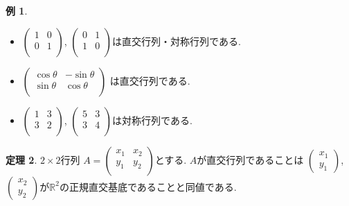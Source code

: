 \documentclass[dvipdfmx,a4paper,11pt]{article}
\newcommand{\R}{\mathbb{R}}
\theoremstyle{definition}
\newtheorem{thm}{定理}
\newtheorem{exa}[thm]{例}
\begin{document}
 \begin{exa}
 \begin{itemize}
\setlength{\parskip}{0cm}
 \setlength{\itemsep}{0pt} 
\item  $\begin{pmatrix}
1& 0 \\
0& 1 \\
\end{pmatrix}
$, 
 $\begin{pmatrix}
0& 1\\
1& 0 \\
\end{pmatrix}
$は直交行列・対称行列である.

\item $
\begin{pmatrix}
\cos \theta & -\sin \theta\\
\sin \theta& \cos \theta  \\
\end{pmatrix}
$
は直交行列である.

\item  $\begin{pmatrix}
1& 3 \\
3& 2 \\
\end{pmatrix}
$, 
 $\begin{pmatrix}
5& 3\\
3& 4 \\
\end{pmatrix}
$は対称行列である.
\end{itemize}
 \end{exa}



 \begin{tcolorbox}[
    colback = white,
    colframe = green!35!black,
    fonttitle = \bfseries,
    breakable = true]
    \begin{thm}
$2 \times 2$行列
$
A=\begin{pmatrix}
 x_1& x_2 \\
y_1& y_2 \\
\end{pmatrix}
$とする.
$A$が直交行列であることは
$
\begin{pmatrix}
 x_1 \\
y_1
\end{pmatrix}
$,
$
\begin{pmatrix}
 x_2 \\
y_2
\end{pmatrix}
$が$\R^2$の正規直交基底であることと同値である.
\end{thm}
 \end{tcolorbox}
 
\end{document}
